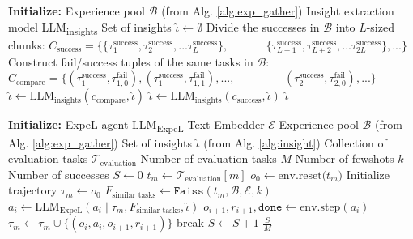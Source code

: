 \documentclass[letterpaper]{article} %
\begin{document}
    \begin{algorithm}
    \caption{ExpeL - Insight Extraction}
    \begin{algorithmic}
    \STATE \textbf{Initialize:} 
    \STATE Experience pool \( \mathcal{B} \) (from Alg. \ref{alg:exp_gather})
    \STATE Insight extraction model LLM\textsubscript{insights}
    \STATE Set of insights \( \hat{\iota} \leftarrow \emptyset\) 
    \STATE Divide the successes in \( \mathcal{B} \) into $L$-sized chunks:
    \STATE \( C_\text{success} = \{ \{\tau_1^\text{success},\tau_2^\text{success},...\tau_L^\text{success}\}, \)
    \STATE \( \quad \quad \quad \{\tau_{L+1}^\text{success},\tau_{L+2}^\text{success},...\tau_{2L}^\text{success}\}, ... \} \)
    \STATE Construct fail/success tuples of the same tasks in \( \mathcal{B} \):
    \STATE \( C_\text{compare} = \{(\tau_1^\text{success},\tau_{1,0}^\text{fail}), (\tau_1^\text{success},\tau_{1,1}^\text{fail}), ...,\)
    \STATE \(\quad \quad \quad \quad (\tau_2^\text{success},\tau_{2,0}^\text{fail}), ... \}\)
        \STATE \( \hat{\iota} \leftarrow \text{LLM}_\text{insights}(c_\text{compare},\hat{\iota}) \)
    \ENDFOR
        \STATE \( \hat{\iota} \leftarrow \text{LLM}_\text{insights}(c_\text{success},\hat{\iota}) \)
    \ENDFOR
    \RETURN \( \hat{\iota} \)
    \end{algorithmic}
    \label{alg:insight}
    \end{algorithm}
    
    \begin{algorithm}
    \caption{ExpeL - Evaluation}
    \begin{algorithmic}
    \STATE \textbf{Initialize:} 
    \STATE ExpeL agent LLM\textsubscript{ExpeL}
    \STATE Text Embedder \( \mathcal{E} \)
    \STATE Experience pool \( \mathcal{B} \) (from Alg. \ref{alg:exp_gather})
    \STATE Set of insights \( \hat{\iota} \) (from Alg. \ref{alg:insight})
    \STATE Collection of evaluation tasks \( \mathcal{T}_\text{evaluation} \)
    \STATE Number of evaluation tasks $M$
    \STATE Number of fewshots $k$
    \STATE Number of successes \( S \leftarrow 0 \)
        \STATE \( t_m \leftarrow \mathcal{T}_\text{evaluation}[m] \)
        \STATE \( o_0 \leftarrow \text{env.reset($t_m$)} \)
        \STATE Initialize trajectory \( \tau_{m} \leftarrow o_0 \)
        \STATE \( F_\text{similar tasks} \leftarrow \texttt{Faiss}(t_m, \mathcal{B}, \mathcal{E}, k) \)
            \STATE \( a_i \leftarrow \text{LLM}_\text{ExpeL}(a_i\mid \tau_{m}, F_\text{similar tasks}, \hat{\iota}) \)
            \STATE \( o_{i+1}, r_{i+1}, \texttt{done} \leftarrow \text{env.step}(a_i) \)
            \STATE \( \tau_{m} \leftarrow \tau_{m} \cup \{(o_i,a_i,o_{i+1},r_{i+1})\} \)
                \STATE break
            \ENDIF
        \ENDFOR
            \STATE \( S \leftarrow S + 1 \)
        \ENDIF
    \ENDFOR
    \RETURN \( \frac{S}{M} \)
    \end{algorithmic}
    \label{alg:eval}
    \end{algorithm}
\end{document}
